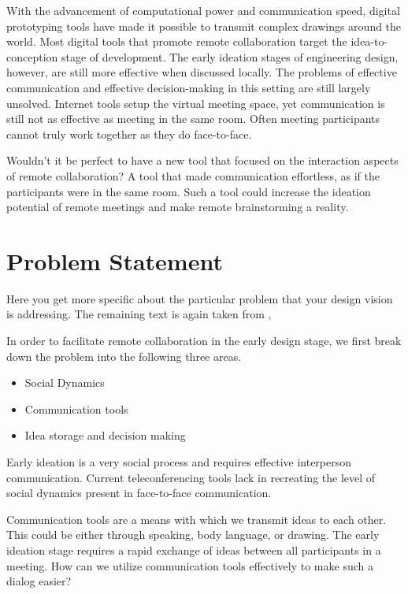 With the advancement of computational power and communication speed, digital prototyping tools have made it possible to transmit complex drawings around the world. Most digital tools that promote remote collaboration target the idea-to-conception stage of development. The early ideation stages of engineering design, however, are still more effective when discussed locally. The problems of effective communication and effective decision-making in this setting are still largely unsolved. Internet tools setup the virtual meeting space, yet communication is still not as effective as meeting in the same room. Often meeting participants cannot truly work together as they do face-to-face.

Wouldn't it be perfect to have a new tool that focused on the interaction aspects of remote collaboration? A tool that made communication effortless, as if the participants were in the same room. Such a tool could increase the ideation potential of remote meetings and make remote brainstorming a reality. 


\section{Problem Statement}
\label{sec:problem}

\begin{remark} \color{blue}
Here you get more specific about the particular problem that your design vision is addressing.
The remaining text is again taken from \cite{Autodesk2008Fall},
\normalcolor \end{remark}

In order to facilitate remote collaboration in the early design stage, we first break down the problem into the following three areas.

\begin{itemize} \tightlist
\item Social Dynamics
\item Communication tools
\item Idea storage and decision making
\end{itemize}

Early ideation is a very social process and requires effective interperson communication. Current teleconferencing tools lack in recreating the level of social dynamics present in face-to-face communication.

Communication tools are a means with which we transmit ideas to each other. This could be either through speaking, body language, or drawing. The early ideation stage requires a rapid exchange of ideas between all participants in a meeting. How can we utilize communication tools effectively to make such a dialog easier?

